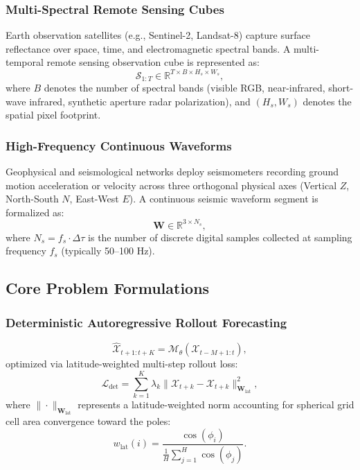 \subsubsection{Multi-Spectral Remote Sensing Cubes}
Earth observation satellites (e.g., Sentinel-2, Landsat-8) capture surface reflectance over space, time, and electromagnetic spectral bands. A multi-temporal remote sensing observation cube is represented as:
\begin{equation}
    \mathcal{S}_{1:T} \in \mathbb{R}^{T \times B \times H_s \times W_s},
\end{equation}
where $B$ denotes the number of spectral bands (visible RGB, near-infrared, short-wave infrared, synthetic aperture radar polarization), and $(H_s, W_s)$ denotes the spatial pixel footprint.

\subsubsection{High-Frequency Continuous Waveforms}
Geophysical and seismological networks deploy seismometers recording ground motion acceleration or velocity across three orthogonal physical axes (Vertical $Z$, North-South $N$, East-West $E$). A continuous seismic waveform segment is formalized as:
\begin{equation}
    \mathbf{W} \in \mathbb{R}^{3 \times N_s},
\end{equation}
where $N_s = f_s \cdot \Delta \tau$ is the number of discrete digital samples collected at sampling frequency $f_s$ (typically 50--100 Hz).

\subsection{Core Problem Formulations}

\subsubsection{Deterministic Autoregressive Rollout Forecasting}
\begin{equation}
    \hat{\mathcal{X}}_{t+1:t+K} = \mathcal{M}_\theta(\mathcal{X}_{t-M+1:t}),
\end{equation}
optimized via latitude-weighted multi-step rollout loss:
\begin{equation}
    \mathcal{L}_{\text{det}} = \sum_{k=1}^K \lambda_k \|\hat{\mathcal{X}}_{t+k} - \mathcal{X}_{t+k}\|_{\mathbf{W}_{\text{lat}}}^2,
\end{equation}
where $\|\cdot\|_{\mathbf{W}_{\text{lat}}}$ represents a latitude-weighted norm accounting for spherical grid cell area convergence toward the poles:
\begin{equation}
    w_{\text{lat}}(i) = \frac{\cos(\phi_i)}{\frac{1}{H} \sum_{j=1}^H \cos(\phi_j)}.
\end{equation}

